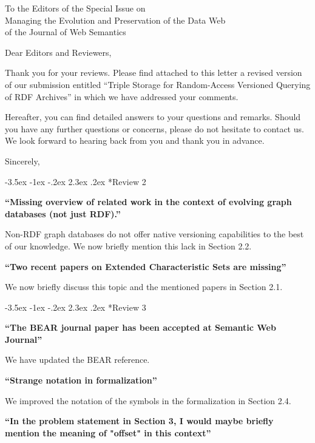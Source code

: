 \documentclass{letter}
\makeatletter
\newcounter{section}
\newcommand\section{\@startsection {section}{1}{\z@}%
                                   {-3.5ex \@plus -1ex \@minus -.2ex}%
                                   {2.3ex \@plus.2ex}%
                                   {\normalfont\Large\bfseries}}
\makeatother
\begin{document}
\begin{letter}{To the Editors of the Special Issue on\\Managing the Evolution and Preservation of the Data Web\\of the Journal of Web Semantics}

\opening{Dear Editors and Reviewers,}

\bigskip

Thank you for your reviews.
Please find attached to this letter a revised version of our submission entitled
\enquote{Triple Storage for Random-Access Versioned Querying of RDF Archives}
in which we have addressed your comments.

\bigskip

Hereafter, you can find detailed answers to your questions and remarks.
Should you have any further questions or concerns, please do not hesitate to contact us.
We look forward to hearing back from you and thank you in advance.

\bigskip

\closing{Sincerely,}

\pagebreak
\section*{Review 2}

\textbf{\enquote{Missing overview of related work in the context of evolving graph databases (not just RDF).}}

Non-RDF graph databases do not offer native versioning capabilities to the best of our knowledge.
We now briefly mention this lack in Section 2.2.

\textbf{\enquote{Two recent papers on Extended Characteristic Sets are missing}}

We now briefly discuss this topic and the mentioned papers in Section 2.1.

\section*{Review 3}

\textbf{\enquote{The BEAR journal paper has been accepted at Semantic Web Journal}}

We have updated the BEAR reference.

\textbf{\enquote{Strange notation in formalization}}

We improved the notation of the symbols in the formalization in Section 2.4.

\textbf{\enquote{In the problem statement in Section 3, I would maybe briefly mention the meaning of "offset" in this context}}


\end{letter}
\end{document}
